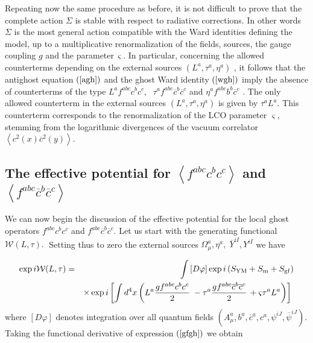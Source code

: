 \documentclass[a4paper,12pt]{article}
\begin{document}
Repeating now the same procedure as before, it is not difficult to prove
that the complete action $\Sigma $ is stable with respect to radiative
corrections. In other words $\Sigma $ is the most general action compatible
with the Ward identities defining the model, up to a multiplicative
renormalization of the fields, sources, the gauge coupling $g$ and the
parameter$\,\varsigma $. In particular, concerning the allowed counterterms
depending on the external sources $\left( L^{a},\tau ^{a},\eta ^{a}\right) $%
, it follows that the antighost equation $\left( \ref{agh}\right) $ and the
ghost Ward identity $\left( \ref{wgh}\right) $ imply  the absence of
counterterms of the type $L^{a}f^{abc}c^{b}c^{c},$ $\;\tau ^{a}f^{abc}%
\overline{c}^{b}\overline{c}^{c}$ and $\eta ^{a}f^{abc}b^{b}\overline{c}^{c}$
\cite{landau,book,dsv}. The only allowed counterterm in the external sources 
$\left( L^{a},\tau ^{a},\eta ^{a}\right) $ is given by $\tau ^{a}L^{a}$.
This counterterm corresponds to the renormalization of the LCO parameter $%
\varsigma $, stemming from the logarithmic divergences of the vacuum
correlator $\left\langle c^{2}(x)\overline{c}^{2}(y)\right\rangle $.

\subsection{The effective potential for $\left\langle
f^{abc}c^{b}c^{c}\right\rangle $ and $\left\langle f^{abc}\overline{c}^{b}%
\overline{c}^{c}\right\rangle $}

We can now begin the discussion of the effective potential for the local
ghost operators $f^{abc}c^{b}c^{c}$ and $f^{abc}\overline{c}^{b}\overline{c}%
^{c}$. Let us start with the generating functional $\mathcal{W}(L,\tau ).\;$%
Setting thus to zero the external sources $\Omega _{\mu }^{a},\eta ^{a},\;%
\overline{Y}^{iI},Y^{iI}$ we have

\begin{eqnarray}
\exp i\mathcal{W}(L,\tau ) &=&\int \left[ D\varphi \right] \exp i\left( S_{%
\mathrm{YM}}+S_{\mathrm{m}}+S_{\mathrm{gf}}\right)   \label{gfgh} \\
&&\times \exp i\left[ \int d^{4}x\left( L^{a}\frac{gf^{abc}c^{b}c^{c}}{2}%
\;-\tau ^{a}\frac{gf^{abc}\overline{c}^{b}\overline{c}^{c}}{2}\,+\varsigma
\tau ^{a}L^{a}\right) \right] \;  \nonumber
\end{eqnarray}
where $\left[ D\varphi \right] $ denotes integration over all quantum fields 
$(A_{\mu }^{a},b^{a},\overline{c}^{a},c^{a},\psi ^{iJ},\overline{\psi }^{iJ})
$. Taking the functional derivative of expression $\left( \ref{gfgh}\right) $
we obtain
\end{document}
